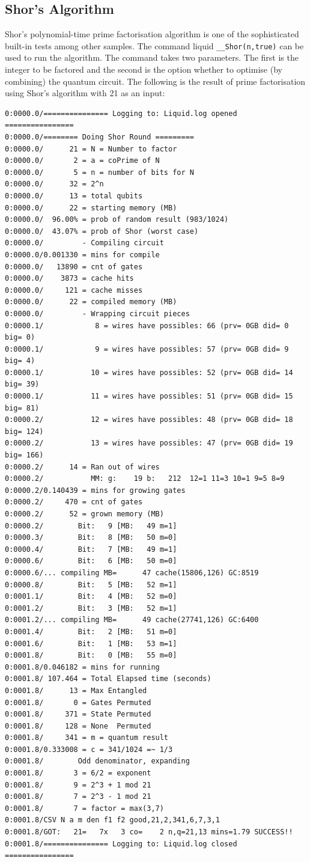 \documentclass[12pt]{third-rep}
\begin{document}
\subsection{Shor's Algorithm}
Shor's polynomial-time prime factorisation algorithm is one of the sophisticated built-in tests among other samples. The command liquid \texttt{\_\_Shor(n,true)} can be used to run the algorithm. The command takes two parameters. The first is the integer to be factored and the second is the option whether to optimise (by combining) the quantum circuit. The following is the result of prime factorisation using Shor's algorithm with 21 as an input:
\begin{verbatim}
0:0000.0/=============== Logging to: Liquid.log opened ================
0:0000.0/======== Doing Shor Round =========
0:0000.0/      21 = N = Number to factor
0:0000.0/       2 = a = coPrime of N
0:0000.0/       5 = n = number of bits for N
0:0000.0/      32 = 2^n
0:0000.0/      13 = total qubits
0:0000.0/      22 = starting memory (MB)
0:0000.0/  96.00% = prob of random result (983/1024)
0:0000.0/  43.07% = prob of Shor (worst case)
0:0000.0/         - Compiling circuit
0:0000.0/0.001330 = mins for compile
0:0000.0/   13890 = cnt of gates
0:0000.0/    3873 = cache hits
0:0000.0/     121 = cache misses
0:0000.0/      22 = compiled memory (MB)
0:0000.0/         - Wrapping circuit pieces
0:0000.1/            8 = wires have possibles: 66 (prv= 0GB did= 0 big= 0)
0:0000.1/            9 = wires have possibles: 57 (prv= 0GB did= 9 big= 4)
0:0000.1/           10 = wires have possibles: 52 (prv= 0GB did= 14 big= 39)
0:0000.1/           11 = wires have possibles: 51 (prv= 0GB did= 15 big= 81)
0:0000.2/           12 = wires have possibles: 48 (prv= 0GB did= 18 big= 124)
0:0000.2/           13 = wires have possibles: 47 (prv= 0GB did= 19 big= 166)
0:0000.2/      14 = Ran out of wires
0:0000.2/           MM: g:    19 b:   212  12=1 11=3 10=1 9=5 8=9
0:0000.2/0.140439 = mins for growing gates
0:0000.2/     470 = cnt of gates
0:0000.2/      52 = grown memory (MB)
0:0000.2/        Bit:   9 [MB:   49 m=1]
0:0000.3/        Bit:   8 [MB:   50 m=0]
0:0000.4/        Bit:   7 [MB:   49 m=1]
0:0000.6/        Bit:   6 [MB:   50 m=0]
0:0000.6/... compiling MB=      47 cache(15806,126) GC:8519
0:0000.8/        Bit:   5 [MB:   52 m=1]
0:0001.1/        Bit:   4 [MB:   52 m=0]
0:0001.2/        Bit:   3 [MB:   52 m=1]
0:0001.2/... compiling MB=      49 cache(27741,126) GC:6400
0:0001.4/        Bit:   2 [MB:   51 m=0]
0:0001.6/        Bit:   1 [MB:   53 m=1]
0:0001.8/        Bit:   0 [MB:   55 m=0]
0:0001.8/0.046182 = mins for running
0:0001.8/ 107.464 = Total Elapsed time (seconds)
0:0001.8/      13 = Max Entangled
0:0001.8/       0 = Gates Permuted
0:0001.8/     371 = State Permuted
0:0001.8/     128 = None  Permuted
0:0001.8/     341 = m = quantum result
0:0001.8/0.333008 = c = 341/1024 =~ 1/3
0:0001.8/        Odd denominator, expanding
0:0001.8/       3 = 6/2 = exponent
0:0001.8/       9 = 2^3 + 1 mod 21
0:0001.8/       7 = 2^3 - 1 mod 21
0:0001.8/       7 = factor = max(3,7)
0:0001.8/CSV N a m den f1 f2 good,21,2,341,6,7,3,1
0:0001.8/GOT:   21=   7x   3 co=    2 n,q=21,13 mins=1.79 SUCCESS!!
0:0001.8/=============== Logging to: Liquid.log closed ================
\end{verbatim}
\end{document}
